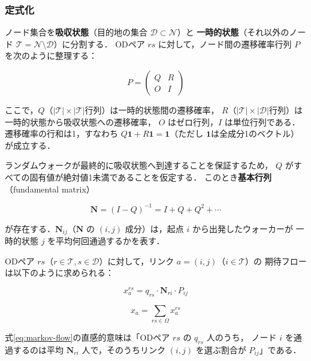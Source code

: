 \subsubsection*{定式化}

ノード集合を\textbf{吸収状態}（目的地の集合 $\mathcal{D} \subset \mathcal{N}$）と
\textbf{一時的状態}（それ以外のノード $\mathcal{T} = \mathcal{N} \setminus \mathcal{D}$）に分割する．
ODペア $rs$ に対して，ノード間の遷移確率行列 $P$ を次のように整理する：

\begin{equation}
  P = \begin{pmatrix} Q & R \\ O & I \end{pmatrix}
  \label{eq:markov-transition}
\end{equation}

ここで，$Q$（$|\mathcal{T}| \times |\mathcal{T}|$行列）は一時的状態間の遷移確率，
$R$（$|\mathcal{T}| \times |\mathcal{D}|$行列）は一時的状態から吸収状態への遷移確率，
$O$ はゼロ行列，$I$ は単位行列である．
遷移確率の行和は1，すなわち $Q\mathbf{1} + R\mathbf{1} = \mathbf{1}$（ただし $\mathbf{1}$は全成分1のベクトル）が成立する．

ランダムウォークが最終的に吸収状態へ到達することを保証するため，
$Q$ がすべての固有値が絶対値1未満であることを仮定する．
このとき\textbf{基本行列}（fundamental matrix）

\begin{equation}
  \mathbf{N} = (I - Q)^{-1} = I + Q + Q^2 + \cdots
  \label{eq:fundamental-matrix}
\end{equation}

が存在する．$\mathbf{N}_{ij}$（$\mathbf{N}$ の $(i,j)$ 成分）は，起点 $i$ から出発したウォーカーが
一時的状態 $j$ を平均何回通過するかを表す．

ODペア $rs$（$r \in \mathcal{T}, s \in \mathcal{D}$）に対して，リンク $a = (i, j)$（$i \in \mathcal{T}$）の
期待フローは以下のように求められる：

\begin{equation}
  x_a^{rs} = q_{rs} \cdot \mathbf{N}_{ri} \cdot P_{ij}
  \label{eq:markov-flow}
\end{equation}

\begin{equation}
  x_a = \sum_{rs \in \Omega} x_a^{rs}
  \label{eq:markov-total-flow}
\end{equation}

式\eqref{eq:markov-flow}の直感的意味は「ODペア $rs$ の $q_{rs}$ 人のうち，
ノード $i$ を通過するのは平均 $\mathbf{N}_{ri}$ 人で，そのうちリンク $(i,j)$ を選ぶ割合が $P_{ij}$」である．

